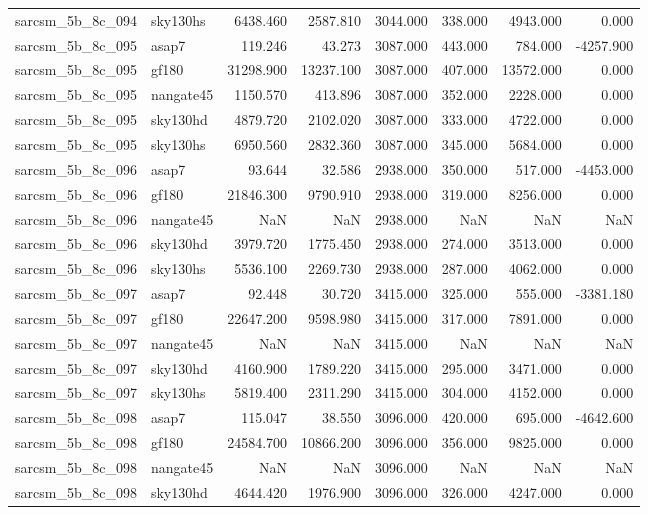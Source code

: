 \begin{tabular}{llrrrrrr}
sarcsm\_5b\_8c\_094 & sky130hs & 6438.460 & 2587.810 & 3044.000 & 338.000 & 4943.000 & 0.000 \\
sarcsm\_5b\_8c\_095 & asap7 & 119.246 & 43.273 & 3087.000 & 443.000 & 784.000 & -4257.900 \\
sarcsm\_5b\_8c\_095 & gf180 & 31298.900 & 13237.100 & 3087.000 & 407.000 & 13572.000 & 0.000 \\
sarcsm\_5b\_8c\_095 & nangate45 & 1150.570 & 413.896 & 3087.000 & 352.000 & 2228.000 & 0.000 \\
sarcsm\_5b\_8c\_095 & sky130hd & 4879.720 & 2102.020 & 3087.000 & 333.000 & 4722.000 & 0.000 \\
sarcsm\_5b\_8c\_095 & sky130hs & 6950.560 & 2832.360 & 3087.000 & 345.000 & 5684.000 & 0.000 \\
sarcsm\_5b\_8c\_096 & asap7 & 93.644 & 32.586 & 2938.000 & 350.000 & 517.000 & -4453.000 \\
sarcsm\_5b\_8c\_096 & gf180 & 21846.300 & 9790.910 & 2938.000 & 319.000 & 8256.000 & 0.000 \\
sarcsm\_5b\_8c\_096 & nangate45 & NaN & NaN & 2938.000 & NaN & NaN & NaN \\
sarcsm\_5b\_8c\_096 & sky130hd & 3979.720 & 1775.450 & 2938.000 & 274.000 & 3513.000 & 0.000 \\
sarcsm\_5b\_8c\_096 & sky130hs & 5536.100 & 2269.730 & 2938.000 & 287.000 & 4062.000 & 0.000 \\
sarcsm\_5b\_8c\_097 & asap7 & 92.448 & 30.720 & 3415.000 & 325.000 & 555.000 & -3381.180 \\
sarcsm\_5b\_8c\_097 & gf180 & 22647.200 & 9598.980 & 3415.000 & 317.000 & 7891.000 & 0.000 \\
sarcsm\_5b\_8c\_097 & nangate45 & NaN & NaN & 3415.000 & NaN & NaN & NaN \\
sarcsm\_5b\_8c\_097 & sky130hd & 4160.900 & 1789.220 & 3415.000 & 295.000 & 3471.000 & 0.000 \\
sarcsm\_5b\_8c\_097 & sky130hs & 5819.400 & 2311.290 & 3415.000 & 304.000 & 4152.000 & 0.000 \\
sarcsm\_5b\_8c\_098 & asap7 & 115.047 & 38.550 & 3096.000 & 420.000 & 695.000 & -4642.600 \\
sarcsm\_5b\_8c\_098 & gf180 & 24584.700 & 10866.200 & 3096.000 & 356.000 & 9825.000 & 0.000 \\
sarcsm\_5b\_8c\_098 & nangate45 & NaN & NaN & 3096.000 & NaN & NaN & NaN \\
sarcsm\_5b\_8c\_098 & sky130hd & 4644.420 & 1976.900 & 3096.000 & 326.000 & 4247.000 & 0.000 \\

\end{tabular}

